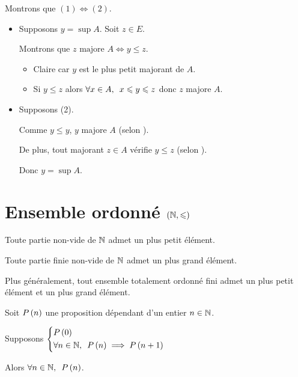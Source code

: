 \begin{dem}
Montrons que \((1)\iff(2)\).

\begin{itemize}
\item[\impdir] Supposons \(y=\sup A\). Soit \(z\in E\).

Montrons que \(z\text{ majore }A\iff y\leq z\).

\begin{itemize}
\item[\impdir] Claire car \(y\) est le plus petit majorant de \(A\).

\item[\imprec] Si \(y\leq z\) alors \(\quantifs{\forall x\in A}x\leq y\leq z\) donc \(z\) majore \(A\).
\end{itemize}

\item[\imprec] Supposons (2).

Comme \(y\leq y\), \(y\) majore \(A\) (selon \imprec).

De plus, tout majorant \(z\in A\) vérifie \(y\leq z\) (selon \impdir).

Donc \(y=\sup A\).
\end{itemize}
\end{dem}

\section{Ensemble ordonné \(\left(\mathbb{N},\leqslant\right)\)}

\begin{theo}
Toute partie non-vide de \(\mathbb{N}\) admet un plus petit élément.
\end{theo}

\begin{dem}
\end{dem}

\begin{prop}
Toute partie finie non-vide de \(\mathbb{N}\) admet un plus grand élément.
\end{prop}

\begin{rem}
Plus généralement, tout ensemble totalement ordonné fini admet un plus petit élément et un plus grand élément.
\end{rem}

\begin{theo}
Soit \(P\left(n\right)\) une proposition dépendant d'un entier \(n\in\mathbb{N}\).

Supposons \(\begin{dcases}P\paren{0} \\ \quantifs{\forall n\in\N}P\paren{n}\imp P\paren{n+1}\end{dcases}\)

Alors \(\quantifs{\forall n\in\N}P\paren{n}\).
\end{theo}

